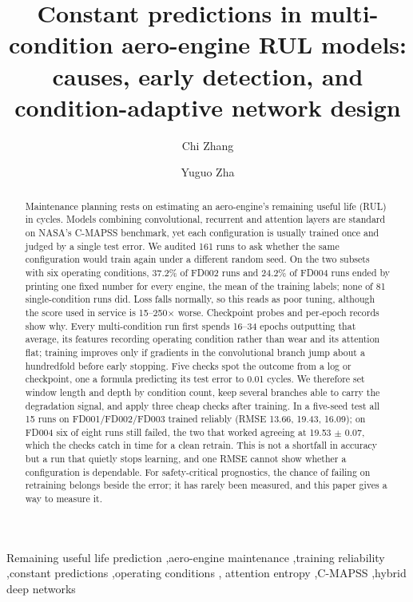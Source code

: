 \begin{frontmatter}

\title{Constant predictions in multi-condition aero-engine RUL models: causes,
early detection, and condition-adaptive network design}

\author[inst1]{Chi Zhang}
\author[inst1]{Yuguo Zha}

\begin{abstract}
Maintenance planning rests on estimating an aero-engine's remaining useful
life (RUL) in cycles. Models combining convolutional, recurrent and
attention layers are standard on NASA's C-MAPSS benchmark, yet each
configuration is usually trained once and judged by a single test error.
We audited 161 runs to ask whether the same configuration would train again
under a different random seed. On the two subsets with six operating
conditions, 37.2\% of FD002 runs and 24.2\% of FD004 runs ended by printing
one fixed number for every engine, the mean of the training labels; none of
81 single-condition runs did. Loss falls normally, so this reads as poor
tuning, although the score used in service is 15--250$\times$ worse.
Checkpoint probes and per-epoch records show why. Every multi-condition run
first spends 16--34 epochs outputting that average, its features recording
operating condition rather than wear and its attention flat; training
improves only if gradients in the convolutional branch jump about a
hundredfold before early stopping. Five checks spot the outcome from a log
or checkpoint, one a formula predicting its test error to 0.01 cycles. We
therefore set window length and depth by condition count, keep several
branches able to carry the degradation signal, and apply three cheap checks
after training. In a five-seed test all 15 runs on FD001/FD002/FD003 trained
reliably (RMSE 13.66, 19.43, 16.09); on FD004 six of eight runs still
failed, the two that worked agreeing at 19.53 $\pm$ 0.07, which the checks
catch in time for a clean retrain. This is not a shortfall in accuracy but
a run that quietly stops learning, and one RMSE cannot show whether a
configuration is dependable. For safety-critical prognostics, the chance
of failing on retraining belongs beside the error; it has rarely been
measured, and this paper gives a way to measure it.
\end{abstract}

\begin{keyword}
Remaining useful life prediction \sep aero-engine maintenance \sep training
reliability \sep constant predictions \sep operating conditions \sep
attention entropy \sep C-MAPSS \sep hybrid deep networks
\end{keyword}

\end{frontmatter}
